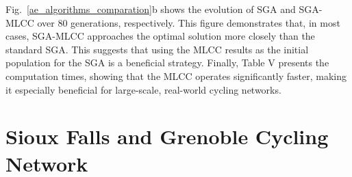 \documentclass[lettersize,journal]{IEEEtran}
\begin{document}
Fig.~\ref{ae_algorithms_comparation}b shows the evolution of SGA and SGA-MLCC over 80 generations, respectively. This figure demonstrates that, in most cases, SGA-MLCC approaches the optimal solution more closely than the standard SGA. This suggests that using the MLCC results as the initial population for the SGA is a beneficial strategy. Finally, Table V presents the computation times, showing that the MLCC operates significantly faster, making it especially beneficial for large-scale, real-world cycling networks.

\section{Sioux Falls and Grenoble Cycling Network}
\label{Grenoble_case}



\end{document}
